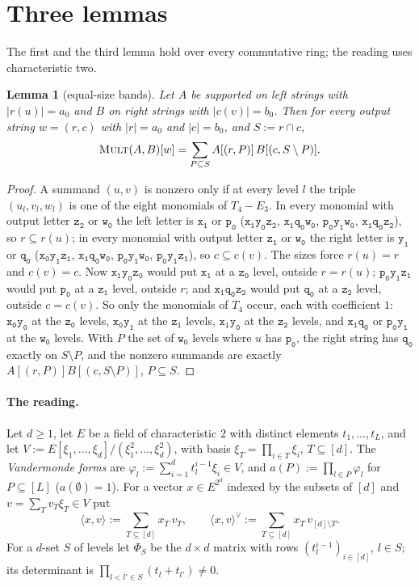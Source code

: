 \documentclass[11pt]{article}
\newtheorem{lemma}[theorem]{Lemma}
\theoremstyle{definition}
\theoremstyle{remark}
\newcommand{\Mult}{\textnormal{\textsc{Mult}}}
\newcommand{\pairL}[2]{\langle #1,#2\rangle}
\newcommand{\pairR}[2]{\langle #1,#2\rangle^{\vee}}
\newcommand{\tl}[1]{\mathtt{#1}}
\begin{document}
\section{Three lemmas}\label{sec:lemmas}

The first and the third lemma hold over every commutative ring; the reading uses characteristic two.

\begin{lemma}[equal-size bands]\label{lem:D}
Let $A$ be supported on left strings with $|r(u)|=a_0$ and $B$ on right strings with $|c(v)|=b_0$. Then for every output string $w=(r,c)$ with $|r|=a_0$ and $|c|=b_0$, and $S:=r\cap c$,
\[
\Mult(A,B)[w]=\sum_{P\subseteq S}A[(r,P)]\,B[(c,S\setminus P)].
\]
\end{lemma}

\begin{proof}
A summand $(u,v)$ is nonzero only if at every level $l$ the triple $(u_l,v_l,w_l)$ is one of the eight monomials of $T_4-E_3$. In every monomial with output letter $\tl{z_2}$ or $\tl{w_0}$ the left letter is $\tl{x_1}$ or $\tl{p_0}$ ($\tl{x_1y_0z_2}$, $\tl{x_1q_0w_0}$, $\tl{p_0y_1w_0}$, $\tl{x_1q_0z_2}$), so $r\subseteq r(u)$; in every monomial with output letter $\tl{z_1}$ or $\tl{w_0}$ the right letter is $\tl{y_1}$ or $\tl{q_0}$ ($\tl{x_0y_1z_1}$, $\tl{x_1q_0w_0}$, $\tl{p_0y_1w_0}$, $\tl{p_0y_1z_1}$), so $c\subseteq c(v)$. The sizes force $r(u)=r$ and $c(v)=c$. Now $\tl{x_1y_0z_0}$ would put $\tl{x_1}$ at a $\tl{z_0}$ level, outside $r=r(u)$; $\tl{p_0y_1z_1}$ would put $\tl{p_0}$ at a $\tl{z_1}$ level, outside $r$; and $\tl{x_1q_0z_2}$ would put $\tl{q_0}$ at a $\tl{z_2}$ level, outside $c=c(v)$. So only the monomials of $T_4$ occur, each with coefficient $1$: $\tl{x_0y_0}$ at the $\tl{z_0}$ levels, $\tl{x_0y_1}$ at the $\tl{z_1}$ levels, $\tl{x_1y_0}$ at the $\tl{z_2}$ levels, and $\tl{x_1q_0}$ or $\tl{p_0y_1}$ at the $\tl{w_0}$ levels. With $P$ the set of $\tl{w_0}$ levels where $u$ has $\tl{p_0}$, the right string has $\tl{q_0}$ exactly on $S\setminus P$, and the nonzero summands are exactly $A[(r,P)]B[(c,S\setminus P)]$, $P\subseteq S$.
\end{proof}

\paragraph{The reading.} Let $d\ge1$, let $E$ be a field of characteristic $2$ with distinct elements $t_1,\dots,t_L$, and let $V:=E[\xi_1,\dots,\xi_d]/(\xi_1^2,\dots,\xi_d^2)$, with basis $\xi_T=\prod_{i\in T}\xi_i$, $T\subseteq[d]$. The \emph{Vandermonde forms} are $\varphi_l:=\sum_{i=1}^dt_l^{i-1}\xi_i\in V$, and $a(P):=\prod_{l\in P}\varphi_l$ for $P\subseteq[L]$ ($a(\emptyset)=1$). For a vector $x\in E^{2^d}$ indexed by the subsets of $[d]$ and $v=\sum_Tv_T\xi_T\in V$ put
\[
\pairL xv:=\sum_{T\subseteq[d]}x_T\,v_T,\qquad \pairR xv:=\sum_{T\subseteq[d]}x_T\,v_{[d]\setminus T}.
\]
For a $d$-set $S$ of levels let $\Phi_S$ be the $d\times d$ matrix with rows $(t_l^{i-1})_{i\in[d]}$, $l\in S$; its determinant is $\prod_{l<l'\in S}(t_l+t_{l'})\ne0$.
\end{document}
